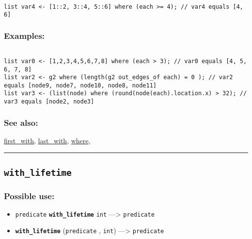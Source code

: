 \documentclass[]{book}
\providecommand{\tightlist}{%
  \setlength{\itemsep}{0pt}\setlength{\parskip}{0pt}}
\theoremstyle{definition}
\theoremstyle{definition}
\theoremstyle{definition}
\theoremstyle{remark}
\begin{document}
\begin{verbatim}
 
list var4 <- [1::2, 3::4, 5::6] where (each >= 4); // var4 equals [4, 6]
\end{verbatim}

\subsubsection{Examples:}\label{examples-382}

\begin{verbatim}
 
list var0 <- [1,2,3,4,5,6,7,8] where (each > 3); // var0 equals [4, 5, 6, 7, 8]  
list var2 <- g2 where (length(g2 out_edges_of each) = 0 ); // var2 equals [node9, node7, node10, node8, node11] 
list var3 <- (list(node) where (round(node(each).location.x) > 32); // var3 equals [node2, node3]
\end{verbatim}

\subsubsection{See also:}\label{see-also-220}

\href{operators-d-to-h.html\#first_with}{first\_with},
\href{operators-i-to-m.html\#last_with}{last\_with},
\href{operators-s-to-z.html\#where}{where},

\begin{center}\rule{0.5\linewidth}{\linethickness}\end{center}

\subsection{\texorpdfstring{\texttt{with\_lifetime}}{with\_lifetime}}\label{with_lifetime}

\subsubsection{Possible use:}\label{possible-use-556}

\begin{itemize}
\tightlist
\item
  \texttt{predicate} \textbf{\texttt{with\_lifetime}} \texttt{int}
  ---\textgreater{} \texttt{predicate}
\item
  \textbf{\texttt{with\_lifetime}} (\texttt{predicate} , \texttt{int})
  ---\textgreater{} \texttt{predicate}
\end{itemize}
\end{document}
